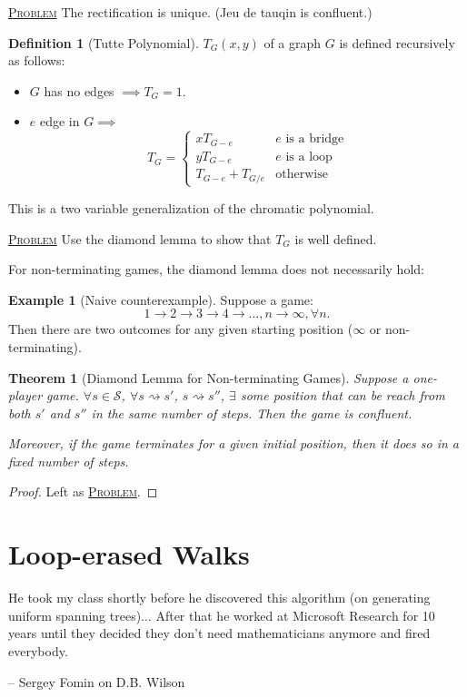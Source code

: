 \documentclass{report}
\newcommand{\fancyem}[1]{\underline{\textsc{#1}}}
\newtheorem{theorem}{Theorem}[section]
\theoremstyle{definition}
\newtheorem{definition}{Definition}[section]
\newtheorem{example}{Example}[section]
\theoremstyle{remark}
\numberwithin{equation}{section}
\begin{document}
\fancyem{Problem} The rectification is unique. (Jeu de tauqin is confluent.)

\begin{definition}[Tutte Polynomial]
    $T_G(x, y)$ of a graph $G$ is defined recursively as follows:
    \begin{itemize}
        \item $G$ has no edges $\implies T_G = 1$.
        \item $e$ edge in $G \implies$ \[
            T_G = \begin{cases}
                xT_{G - e} & e \text{ is a bridge} \\
                yT_{G - e} & e \text{ is a loop} \\
                T_{G - e} + T_{G / e} & \text{otherwise}
            \end{cases}    
        \]
    \end{itemize}
\end{definition}
This is a two variable generalization of the chromatic polynomial.

\fancyem{Problem} Use the diamond lemma to show that $T_G$ is well defined.

For non-terminating games, the diamond lemma does not necessarily hold:
\begin{example}[Naive counterexample]
    Suppose a game:
    \[
        1 \to 2 \to 3 \to 4 \to \ldots, n \to \infty, \forall n.
    \]
    Then there are two outcomes for any given starting position ($\infty$ or non-terminating).
\end{example}

\begin{theorem}[Diamond Lemma for Non-terminating Games]
    Suppose a one-player game. $\forall s \in \mathcal{S}$, $\forall s \rightsquigarrow s'$, $s \rightsquigarrow s''$, $\exists$ some position that can be reach from both $s'$ and $s''$ in the same number of steps. Then the game is confluent.

    Moreover, if the game terminates for a given initial position, then it does so in a fixed number of steps.
\end{theorem}
\begin{proof}
    Left as \fancyem{Problem}.
\end{proof}

\section{Loop-erased Walks}
\epigraph{He took my class shortly before he discovered this algorithm (on generating uniform spanning trees)... After that he worked at Microsoft Research for 10 years until they decided they don't need mathematicians anymore and fired everybody.}{-- \textup{Sergey Fomin on D.B. Wilson}}
\end{document}
